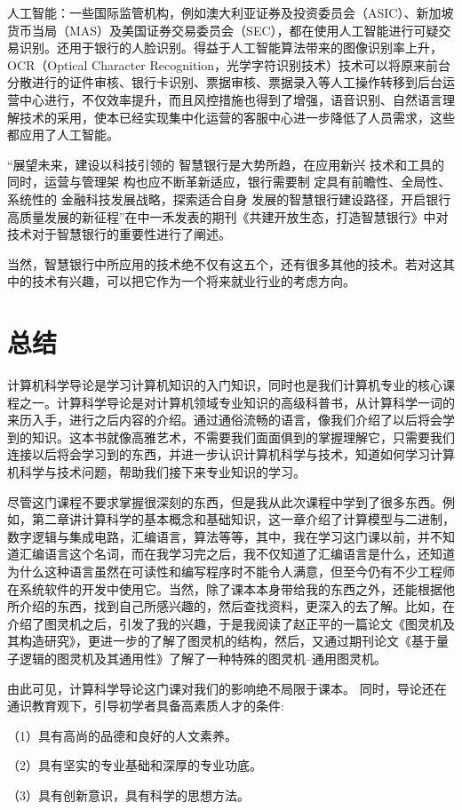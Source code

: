 \documentclass{article}
\begin{document}
人工智能：一些国际监管机构，例如澳大利亚证券及投资委员会（ASIC）、新加坡货币当局（MAS）及美国证券交易委员会（SEC），都在使用人工智能进行可疑交易识别。还用于银行的人脸识别。得益于人工智能算法带来的图像识别率上升，OCR（Optical Character Recognition，光学字符识别技术）技术可以将原来前台分散进行的证件审核、银行卡识别、票据审核、票据录入等人工操作转移到后台运营中心进行，不仅效率提升，而且风控措施也得到了增强，语音识别、自然语言理解技术的采用，使本已经实现集中化运营的客服中心进一步降低了人员需求，这些都应用了人工智能。\par
“展望未来，建设以科技引领的 智慧银行是大势所趋，在应用新兴 技术和工具的同时，运营与管理架 构也应不断革新适应，银行需要制 定具有前瞻性、全局性、系统性的 金融科技发展战略，探索适合自身 发展的智慧银行建设路径，开启银行高质量发展的新征程”在中一禾发表的期刊《共建开放生态，打造智慧银行》\citep{zhongyihe}中对技术对于智慧银行的重要性进行了阐述。\par
当然，智慧银行中所应用的技术绝不仅有这五个，还有很多其他的技术。若对这其中的技术有兴趣，可以把它作为一个将来就业行业的考虑方向。\par




\section{总结}

计算机科学导论是学习计算机知识的入门知识，同时也是我们计算机专业的核心课程之一。计算科学导论是对计算机领域专业知识的高级科普书，从计算科学一词的来历入手，进行之后内容的介绍。通过通俗流畅的语言，像我们介绍了以后将会学到的知识。这本书就像高雅艺术，不需要我们面面俱到的掌握理解它，只需要我们连接以后将会学习到的东西，并进一步认识计算机科学与技术，知道如何学习计算机科学与技术问题，帮助我们接下来专业知识的学习。\par
尽管这门课程不要求掌握很深刻的东西，但是我从此次课程中学到了很多东西。例如，第二章讲计算科学的基本概念和基础知识，这一章介绍了计算模型与二进制，数字逻辑与集成电路，汇编语言，算法等等，其中，我在学习这门课以前，并不知道汇编语言这个名词，而在我学习完之后，我不仅知道了汇编语言是什么，还知道为什么这种语言虽然在可读性和编写程序时不能令人满意，但至今仍有不少工程师在系统软件的开发中使用它。当然，除了课本本身带给我的东西之外，还能根据他所介绍的东西，找到自己所感兴趣的，然后查找资料，更深入的去了解。比如，在介绍了图灵机之后，引发了我的兴趣，于是我阅读了赵正平的一篇论文《图灵机及其构造研究》\citep{zhaozhengping}，更进一步的了解了图灵机的结构，然后，又通过期刊论文《基于量子逻辑的图灵机及其通用性》\citep{liping}了解了一种特殊的图灵机--通用图灵机。\par
由此可见，计算科学导论这门课对我们的影响绝不局限于课本。
同时，导论还在通识教育观下，引导初学者具备高素质人才的条件: \par
（1）具有高尚的品德和良好的人文素养。 \par
（2）具有坚实的专业基础和深厚的专业功底。 \par
（3）具有创新意识，具有科学的思想方法。 \par
\end{document}
